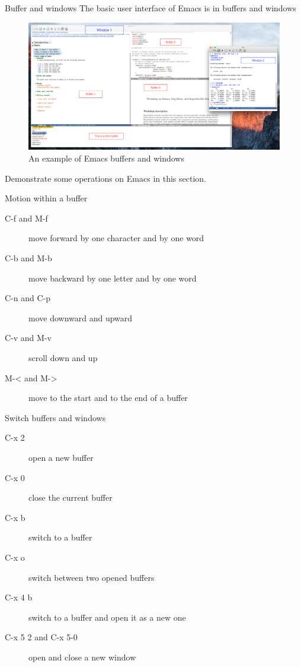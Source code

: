\documentclass[presentation]{beamer}
\begin{document}
\begin{frame}[label={sec:orga366705}]{Buffer and windows}
The basic user interface of Emacs is in buffers and windows

\begin{figure}[htbp]
\centering
\includegraphics[width=1.0\textwidth,height=0.8\textheight]{figure/buffer_example.png}
\caption{An example of Emacs buffers and windows}
\end{figure}

\begin{NOTES}
Demonstrate some operations on Emacs in this section.
\end{NOTES}
\end{frame}

\begin{frame}[label={sec:orga9ba6fa}]{Motion within a buffer}
\begin{description}
\item[{C-f and M-f}] move forward by one character and by one word
\item[{C-b and M-b}] move backward by one letter and by one word
\item[{C-n and C-p}] move downward and upward
\item[{C-v and M-v}] scroll down and up
\item[{M-< and M->}] move to the start and to the end of a buffer
\end{description}
\end{frame}

\begin{frame}[label={sec:org39396cd}]{Switch buffers and windows}
\begin{description}
\item[{C-x 2}] open a new buffer
\item[{C-x 0}] close the current buffer
\item[{C-x b}] switch to a buffer
\item[{C-x o}] switch between two opened buffers
\item[{C-x 4 b}] switch to a buffer and open it as a new one
\item[{C-x 5 2 and C-x 5-0}] open and close a new window
\end{description}
\end{frame}
\end{document}
